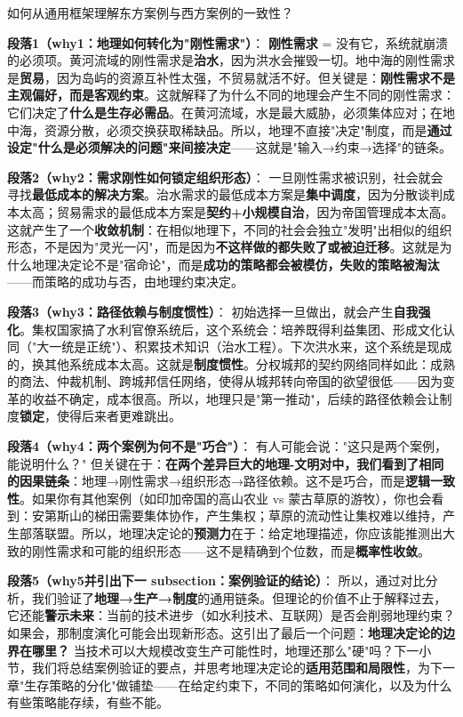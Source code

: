 \documentclass[../main.tex]{subfiles}
\begin{document}
	\begin{questionbox}
		如何从通用框架理解东方案例与西方案例的一致性？
	\end{questionbox}
	
	\textbf{段落1（why1：地理如何转化为"刚性需求"）}：  
	\textbf{刚性需求} = 没有它，系统就崩溃的必须项。黄河流域的刚性需求是\textbf{治水}，因为洪水会摧毁一切。地中海的刚性需求是\textbf{贸易}，因为岛屿的资源互补性太强，不贸易就活不好。但关键是：\textbf{刚性需求不是主观偏好，而是客观约束}。这就解释了为什么不同的地理会产生不同的刚性需求：它们决定了\textbf{什么是生存必需品}。在黄河流域，水是最大威胁，必须集体应对；在地中海，资源分散，必须交换获取稀缺品。所以，地理不直接"决定"制度，而是\textbf{通过设定"什么是必须解决的问题"来间接决定}——这就是"输入→约束→选择"的链条。
	
	\textbf{段落2（why2：需求刚性如何锁定组织形态）}：  
	一旦刚性需求被识别，社会就会寻找\textbf{最低成本的解决方案}。治水需求的最低成本方案是\textbf{集中调度}，因为分散谈判成本太高；贸易需求的最低成本方案是\textbf{契约+小规模自治}，因为帝国管理成本太高。这就产生了一个\textbf{收敛机制}：在相似地理下，不同的社会会独立"发明"出相似的组织形态，不是因为"灵光一闪"，而是因为\textbf{不这样做的都失败了或被迫迁移}。这就是为什么地理决定论不是"宿命论"，而是\textbf{成功的策略都会被模仿，失败的策略被淘汰}——而策略的成功与否，由地理约束决定。
	
	\textbf{段落3（why3：路径依赖与制度惯性）}：  
	初始选择一旦做出，就会产生\textbf{自我强化}。集权国家搞了水利官僚系统后，这个系统会：培养既得利益集团、形成文化认同（"大一统是正统"）、积累技术知识（治水工程）。下次洪水来，这个系统是现成的，换其他系统成本太高。这就是\textbf{制度惯性}。分权城邦的契约网络同样如此：成熟的商法、仲裁机制、跨城邦信任网络，使得从城邦转向帝国的欲望很低——因为变革的收益不确定，成本很高。所以，地理只是"第一推动"，后续的路径依赖会让制度\textbf{锁定}，使得后来者更难跳出。
	
	\textbf{段落4（why4：两个案例为何不是"巧合"）}：  
	有人可能会说："这只是两个案例，能说明什么？" 但关键在于：\textbf{在两个差异巨大的地理-文明对中，我们看到了相同的因果链条}：地理→刚性需求→组织形态→路径依赖。这不是巧合，而是\textbf{逻辑一致性}。如果你有其他案例（如印加帝国的高山农业 vs 蒙古草原的游牧），你也会看到：安第斯山的梯田需要集体协作，产生集权；草原的流动性让集权难以维持，产生部落联盟。所以，地理决定论的\textbf{预测力}在于：给定地理描述，你应该能推测出大致的刚性需求和可能的组织形态——这不是精确到个位数，而是\textbf{概率性收敛}。
	
	\textbf{段落5（why5并引出下一 subsection：案例验证的结论）}：  
	所以，通过对比分析，我们验证了\textbf{地理→生产→制度}的通用链条。但理论的价值不止于解释过去，它还能\textbf{警示未来}：当前的技术进步（如水利技术、互联网）是否会削弱地理约束？如果会，那制度演化可能会出现新形态。这引出了最后一个问题：\textbf{地理决定论的边界在哪里？} 当技术可以大规模改变生产可能性时，地理还那么"硬"吗？下一小节，我们将总结案例验证的要点，并思考地理决定论的\textbf{适用范围和局限性}，为下一章"生存策略的分化"做铺垫——在给定约束下，不同的策略如何演化，以及为什么有些策略能存续，有些不能。
	
\end{document}
